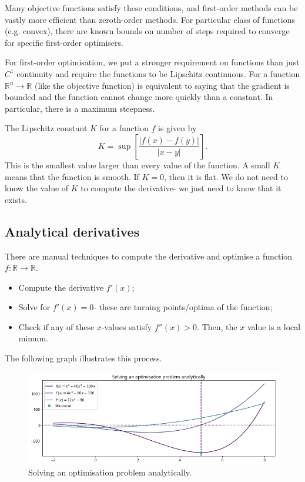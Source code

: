 \documentclass[a4paper, openany]{memoir}
\begin{document}
Many objective functions satisfy these conditions, and first-order methods can be vastly more efficient than zeroth-order methods. For particular class of functions (e.g. convex), there are known bounds on number of steps required to converge for specific first-order optimisers.

For first-order optimisation, we put a stronger requirement on functions than just $C^1$ continuity and require the functions to be Lipschitz continuous. For a function $\mathbb{R}^n \to \mathbb{R}$ (like the objective function) is equivalent to saying that the gradient is bounded and the function cannot change more quickly than a constant. In particular, there is a maximum steepness.

The Lipschitz constant $K$ for a function $f$ is given by
\[K = \sup \left[\frac{|f(x) - f(y)|}{|x-y|}\right].\]
This is the smallest value larger than every value of the function. A small $K$ means that the function is smooth. If $K = 0$, then it is flat. We do not need to know the value of $K$ to compute the derivative- we just need to know that it exists.

\subsection{Analytical derivatives}
There are manual techniques to compute the derivative and optimise a function $f: \mathbb{R} \to \mathbb{R}$.
\begin{itemize}
    \item Compute the derivative $f'(x)$;
    \item Solve for $f'(x) = 0$- these are turning points/optima of the function;
    \item Check if any of these $x$-values satisfy $f''(x) > 0$. Then, the $x$ value is a local mimum.
\end{itemize}
The following graph illustrates this process.
\begin{figure}[H]
    \centering
    \includegraphics[scale=0.42]{src/4.25 solving an optimisation problem analytically.png}
    \caption{Solving an optimisation problem analytically.}
\end{figure}
\end{document}
